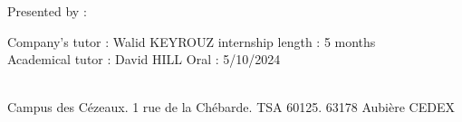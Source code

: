 \begin{titlepage}
\begin{center}
    \vspace{1.5cm}
    \begin{large}
      Presented by : \textbf{\authorName}\\
    \end{large}
  \end{center}

  \vspace{4cm}
  Company's tutor : Walid KEYROUZ \hfill internship length : 5 months\\
  Academical tutor : David HILL \hfill Oral : 5/10/2024\\~\\

  \begin{center}
    \begin{small}
      Campus des Cézeaux. 1 rue de la Chébarde. TSA 60125. 63178 Aubière CEDEX\par
    \end{small}
  \end{center}
\end{titlepage}
